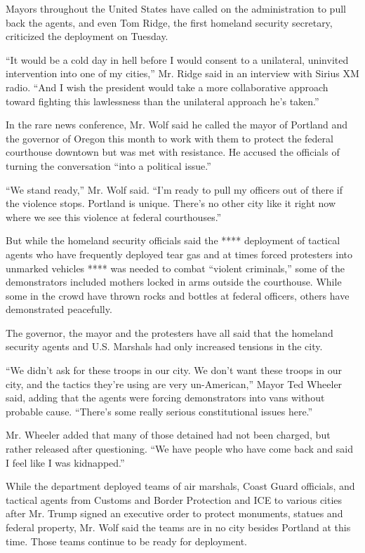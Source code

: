 Mayors throughout the United States have called on the administration to
pull back the agents, and even Tom Ridge, the first homeland security
secretary, criticized the deployment on Tuesday.

``It would be a cold day in hell before I would consent to a unilateral,
uninvited intervention into one of my cities,'' Mr. Ridge said in an
interview with Sirius XM radio. ``And I wish the president would take a
more collaborative approach toward fighting this lawlessness than the
unilateral approach he's taken.''

In the rare news conference, Mr. Wolf said he called the mayor of
Portland and the governor of Oregon this month to work with them to
protect the federal courthouse downtown but was met with resistance. He
accused the officials of turning the conversation ``into a political
issue.''

``We stand ready,'' Mr. Wolf said. ``I'm ready to pull my officers out
of there if the violence stops. Portland is unique. There's no other
city like it right now where we see this violence at federal
courthouses.''

But while the homeland security officials said the **** deployment of
tactical agents who have frequently deployed tear gas and at times
forced protesters into unmarked vehicles **** was needed to combat
``violent criminals,'' some of the demonstrators included mothers locked
in arms outside the courthouse. While some in the crowd have thrown
rocks and bottles at federal officers, others have demonstrated
peacefully.

The governor, the mayor and the protesters have all said that the
homeland security agents and U.S. Marshals had only increased tensions
in the city.

``We didn't ask for these troops in our city. We don't want these troops
in our city, and the tactics they're using are very un-American,'' Mayor
Ted Wheeler said, adding that the agents were forcing demonstrators into
vans without probable cause. ``There's some really serious
constitutional issues here.''

Mr. Wheeler added that many of those detained had not been charged, but
rather released after questioning. ``We have people who have come back
and said I feel like I was kidnapped.''

While the department deployed teams of air marshals, Coast Guard
officials, and tactical agents from Customs and Border Protection and
ICE to various cities after Mr. Trump signed an executive order to
protect monuments, statues and federal property, Mr. Wolf said the teams
are in no city besides Portland at this time. Those teams continue to be
ready for deployment.

